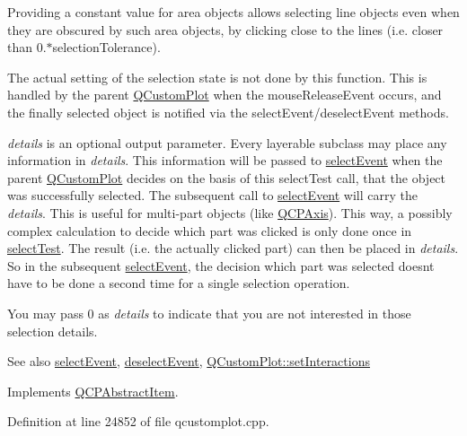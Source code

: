 Providing a constant value for area objects allows selecting line objects even when they are obscured by such area objects, by clicking close to the lines (i.\+e. closer than 0.$\ast$selection\+Tolerance).

The actual setting of the selection state is not done by this function. This is handled by the parent \hyperlink{class_q_custom_plot}{Q\+Custom\+Plot} when the mouse\+Release\+Event occurs, and the finally selected object is notified via the select\+Event/deselect\+Event methods.

{\itshape details} is an optional output parameter. Every layerable subclass may place any information in {\itshape details}. This information will be passed to \hyperlink{class_q_c_p_abstract_item_aaf92af7b9893712959a6c073d334d88d}{select\+Event} when the parent \hyperlink{class_q_custom_plot}{Q\+Custom\+Plot} decides on the basis of this select\+Test call, that the object was successfully selected. The subsequent call to \hyperlink{class_q_c_p_abstract_item_aaf92af7b9893712959a6c073d334d88d}{select\+Event} will carry the {\itshape details}. This is useful for multi-\/part objects (like \hyperlink{class_q_c_p_axis}{Q\+C\+P\+Axis}). This way, a possibly complex calculation to decide which part was clicked is only done once in \hyperlink{class_q_c_p_item_text_a285b95bb6634c2e4f7768abb7a8bc69c}{select\+Test}. The result (i.\+e. the actually clicked part) can then be placed in {\itshape details}. So in the subsequent \hyperlink{class_q_c_p_abstract_item_aaf92af7b9893712959a6c073d334d88d}{select\+Event}, the decision which part was selected doesn\textquotesingle{}t have to be done a second time for a single selection operation.

You may pass 0 as {\itshape details} to indicate that you are not interested in those selection details.

\begin{DoxySeeAlso}{See also}
\hyperlink{class_q_c_p_abstract_item_aaf92af7b9893712959a6c073d334d88d}{select\+Event}, \hyperlink{class_q_c_p_abstract_item_a91f090d6763cfedb0749219c63788ae9}{deselect\+Event}, \hyperlink{class_q_custom_plot_a5ee1e2f6ae27419deca53e75907c27e5}{Q\+Custom\+Plot\+::set\+Interactions} 
\end{DoxySeeAlso}


Implements \hyperlink{class_q_c_p_abstract_item_a96d522d10ffc0413b9a366c6f7f0476b}{Q\+C\+P\+Abstract\+Item}.



Definition at line 24852 of file qcustomplot.\+cpp.



